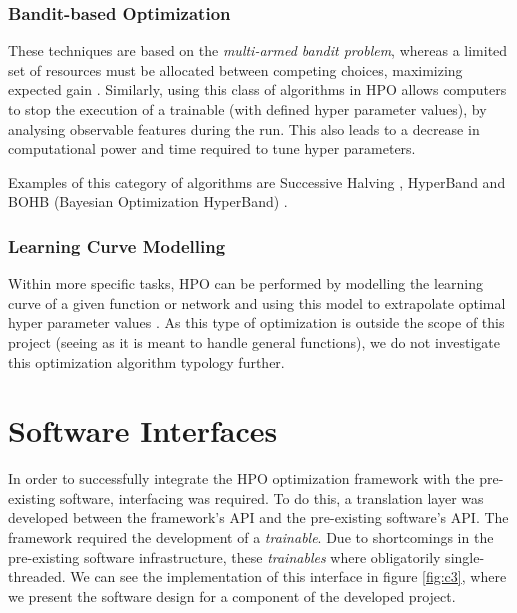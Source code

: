 \documentclass[runningheads]{llncs}
\begin{document}
\subsubsection{Bandit-based Optimization}

These techniques are based on the \textit{multi-armed bandit problem}, whereas a limited set of resources must be allocated between competing choices, maximizing expected gain \cite{Katehakis1987TheMB}. Similarly, using this class of algorithms in HPO allows computers to stop the execution of a trainable (with defined hyper parameter values), by analysing observable features during the run. This also leads to a decrease in computational power and time required to tune hyper parameters.

Examples of this category of algorithms are Successive Halving \cite{jamieson2015nonstochastic}, HyperBand \cite{li2016hyperband} and BOHB (Bayesian Optimization HyperBand) \cite{pmlr-v80-falkner18a}.

\subsubsection{Learning Curve Modelling}

Within more specific tasks, HPO can be performed by modelling the learning curve of a given function or network and using this model to extrapolate optimal hyper parameter values \cite{10555}. As this type of optimization is outside the scope of this project (seeing as it is meant to handle general functions), we do not investigate this optimization algorithm typology further.

\section{Software Interfaces}

In order to successfully integrate the HPO optimization framework with the pre-existing software, interfacing was required. To do this, a translation layer was developed between the framework's API and the pre-existing software's API. The framework required the development of a \textit{trainable}. Due to shortcomings in the pre-existing software infrastructure, these \textit{trainables} where obligatorily single-threaded. We can see the implementation of this interface in figure \ref{fig:c3}, where we present the software design for a component of the developed project.
\end{document}
